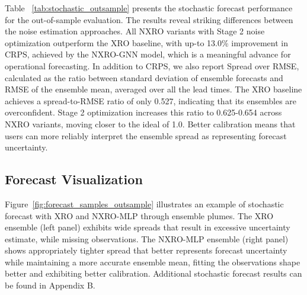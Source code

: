 Table ~\ref{tab:stochastic_outsample} presents the stochastic forecast performance for the out-of-sample evaluation. The results reveal striking differences between the noise estimation approaches. All NXRO variants with Stage 2 noise optimization outperform the XRO baseline, with up-to 13.0\% improvement in CRPS, achieved by the NXRO-GNN model, which is a meaningful advance for operational forecasting. In addition to CRPS, we also report Spread over RMSE, calculated as the ratio between standard deviation of ensemble forecasts and RMSE of the ensemble mean, averaged over all the lead times. The XRO baseline achieves a spread-to-RMSE ratio of only 0.527, indicating that its ensembles are overconfident. Stage 2 optimization increases this ratio to 0.625-0.654 across NXRO variants, moving closer to the ideal of 1.0. Better calibration means that users can more reliably interpret the ensemble spread as representing forecast uncertainty. %


\vspace{-9pt}
\subsection{Forecast Visualization}

Figure~\ref{fig:forecast_samples_outsample} illustrates an example of stochastic forecast with XRO and NXRO-MLP through ensemble plumes. The XRO ensemble (left panel) exhibits wide spreads that result in excessive uncertainty estimate, while missing observations. The NXRO-MLP ensemble (right panel) shows appropriately tighter spread that better represents forecast uncertainty while maintaining a more accurate ensemble mean, fitting the observations shape better and exhibiting better calibration. Additional stochastic forecast results can be found in Appendix B.

